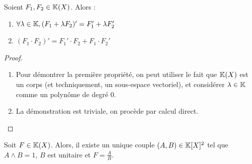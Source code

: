 \documentclass[12pt,a4paper]{report}
\begin{document}
\begin{property}
    Soient $F_1,F_2 \in \mathbb{K}(X)$. Alors :

    \begin{enumerate}
        \item $\forall \lambda \in\mathbb{K}, (F_1 + \lambda F_2)' = F_1' + \lambda F_2'$
        \item $(F_1 \cdot F_2)' = F_1' \cdot F_2 + F_1 \cdot F_2'$
    \end{enumerate}
\end{property}

\begin{proof}
    \begin{enumerate}
        \item Pour démontrer la première propriété, on peut utiliser le fait que $\mathbb{K}(X)$ est un corps (et techniquement, un sous-espace vectoriel), et considérer $\lambda \in \mathbb{K}$ comme un polynôme de degré $0$.
        \item La démonstration est triviale, on procède par calcul direct.
    \end{enumerate}
\end{proof}

\begin{theorem}
    Soit $F \in \mathbb{K}(X)$. Alors, il existe un unique couple $(A,B) \in \mathbb{K}[X]^2$ tel que $A \wedge B = 1$, $B$ est unitaire et $F = \frac AB$.
\end{theorem}
\end{document}
